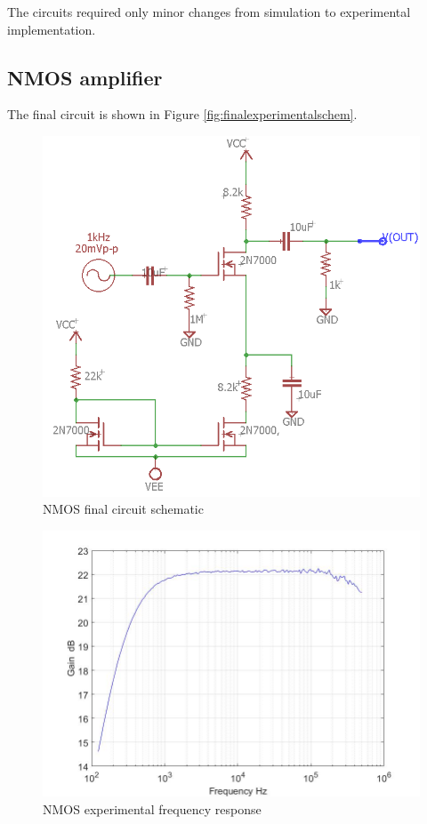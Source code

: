 
The circuits required only minor changes from simulation to experimental implementation.	
	

\subsection{NMOS amplifier}
The final circuit is shown in Figure \ref{fig:finalexperimentalschem}.
\begin{figure}[H]
	\centering
	\includegraphics[width=0.7\linewidth]{ExperimentalImplementation/NMOS_exp}
	\caption{NMOS final circuit schematic}
	\label{fig:nmosexp}
\end{figure}



\begin{figure}[H]
	\centering
	\includegraphics[width=0.7\linewidth]{ExperimentalImplementation/nmosamp.jpg}
	\caption{NMOS experimental frequency response}
	\label{fig:nmosfreq}
\end{figure}

